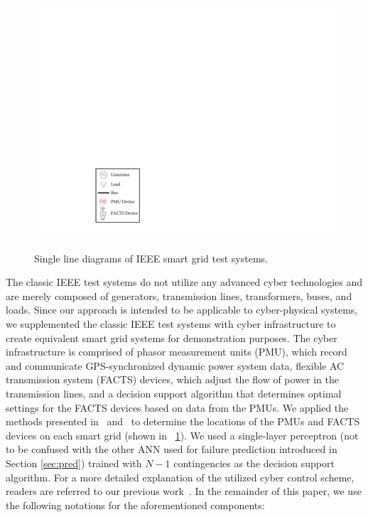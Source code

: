 \documentclass[12pt]{elsarticle}
\begin{document}
\begin{figure}[H]
\centering
{}
~
\subfloat
{\includegraphics[width=0.20\columnwidth]{ieee_cases_legend}
\label{fig:ieee_legend}}

\setcounter{subfigure}{1}
\caption{Single line diagrams of IEEE smart grid test systems.}
\label{fig:ieee_bus_systems}
\end{figure}

The classic IEEE test systems do not utilize any advanced cyber technologies and are merely composed of generators, transmission lines, transformers, buses, and loads. Since our approach is intended to be applicable to cyber-physical systems, we supplemented the classic IEEE test systems with cyber infrastructure to create equivalent smart grid systems for demonstration purposes. The cyber infrastructure is comprised of phasor measurement units (PMU), which record and communicate GPS-synchronized dynamic power system data, flexible AC transmission system (FACTS) devices, which adjust the flow of power in the transmission lines, and a decision support algorithm that determines optimal settings for the FACTS devices based on data from the PMUs. We applied the methods presented in~\cite{AsK11} and~\cite{AcM07} to determine the locations of the PMUs and FACTS devices on each smart grid (shown in \figurename~\ref{fig:ieee_bus_systems}). We used a single-layer perceptron (not to be confused with the other ANN used for failure prediction introduced in Section \ref{sec:pred}) trained with $N-1$ contingencies as the decision support algorithm. For a more detailed explanation of the utilized cyber control scheme, readers are referred to our previous work~\cite{MaS14,MaS18}. In the remainder of this paper, we use the following notations for the aforementioned components:
\end{document}
